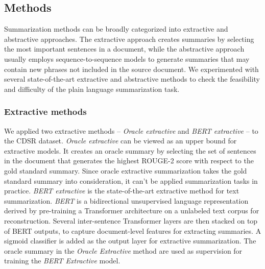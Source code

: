 \documentclass[letterpaper, table]{article} %
\begin{document}



\subsection{Methods}
Summarization methods can be broadly categorized into extractive and abstractive approaches. The extractive approach
creates summaries by selecting the most important sentences in a document,
while the abstractive approach usually employs sequence-to-sequence models to generate summaries that may contain new phrases not included in the source document. We experimented with several state-of-the-art extractive and abstractive methods to check the feasibility and difficulty of the plain language summarization task.
\subsubsection{Extractive methods}
We applied two extractive methods -- \textit{Oracle extractive} and \textit{BERT extractive} \cite{liu2019text} -- to the CDSR dataset. \textit{Oracle extractive} can be viewed as an upper bound for extractive models. It creates an oracle summary by selecting the set of sentences in the document that generates the highest ROUGE-2 score with respect to the gold standard summary. Since oracle extractive summarization takes the gold standard summary into consideration, it can't be applied summarization tasks in practice. \textit{BERT extractive} is the state-of-the-art extractive method for text summarization. \textit{BERT} \cite{devlin2018bert} is a bidirectional unsupervised language representation derived by pre-training a Transformer architecture on a unlabeled text corpus for reconstruction. Several inter-sentence Transformer layers are then stacked on top of BERT outputs, to capture document-level features for extracting summaries. A sigmoid classifier is added as the output layer for extractive summarization. The oracle summary in the \textit{Oracle Extractive} method are used as supervision for training the \textit{BERT Extractive} model.
\end{document}
